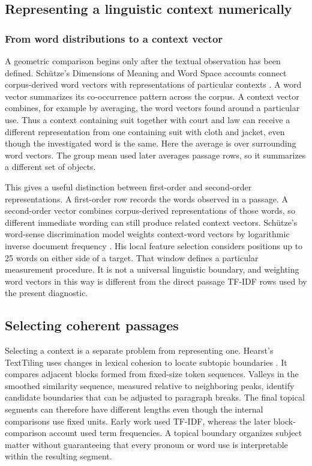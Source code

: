\documentclass[10pt,letterpaper]{article}
\begin{document}
\subsection{Representing a linguistic context numerically}
\subsubsection{From word distributions to a context vector}
A geometric comparison begins only after the textual observation has been defined. Schütze's Dimensions of Meaning and Word Space accounts connect corpus-derived word vectors with representations of particular contexts \cite{schutze92,wordspace}. A word vector summarizes its co-occurrence pattern across the corpus. A context vector combines, for example by averaging, the word vectors found around a particular use. Thus a context containing suit together with court and law can receive a different representation from one containing suit with cloth and jacket, even though the investigated word is the same. Here the average is over surrounding word vectors. The group mean used later averages passage rows, so it summarizes a different set of objects.\par

This gives a useful distinction between first-order and second-order representations. A first-order row records the words observed in a passage. A second-order vector combines corpus-derived representations of those words, so different immediate wording can still produce related context vectors. Schütze's word-sense discrimination model weights context-word vectors by logarithmic inverse document frequency \cite{schutze98}. His local feature selection considers positions up to 25 words on either side of a target. That window defines a particular measurement procedure. It is not a universal linguistic boundary, and weighting word vectors in this way is different from the direct passage TF-IDF rows used by the present diagnostic.\par

\subsection{Selecting coherent passages}
Selecting a context is a separate problem from representing one. Hearst's TextTiling uses changes in lexical cohesion to locate subtopic boundaries \cite{hearst93,hearstplaunt,hearst94,hearst97}. It compares adjacent blocks formed from fixed-size token sequences. Valleys in the smoothed similarity sequence, measured relative to neighboring peaks, identify candidate boundaries that can be adjusted to paragraph breaks. The final topical segments can therefore have different lengths even though the internal comparisons use fixed units. Early work used TF-IDF, whereas the later block-comparison account used term frequencies. A topical boundary organizes subject matter without guaranteeing that every pronoun or word use is interpretable within the resulting segment.\par
\end{document}
